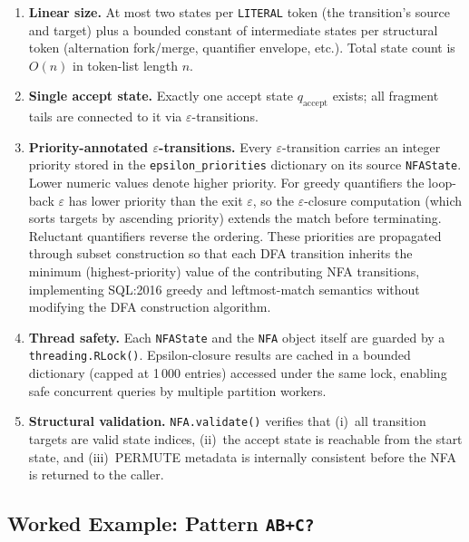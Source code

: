 \begin{enumerate}
  \item \textbf{Linear size.}  At most two states per
    \texttt{LITERAL} token (the transition's source and target)
    plus a bounded constant of intermediate states per structural
    token (alternation fork/merge, quantifier envelope, etc.).
    Total state count is $O(n)$ in token-list length $n$.

  \item \textbf{Single accept state.}  Exactly one accept state
    $q_\text{accept}$ exists; all fragment tails are connected to
    it via $\varepsilon$-transitions.

  \item \textbf{Priority-annotated $\varepsilon$-transitions.}
    Every $\varepsilon$-transition carries an integer priority
    stored in the \texttt{epsilon\_priorities} dictionary on its
    source \texttt{NFAState}.  Lower numeric values denote higher
    priority.  For greedy quantifiers the loop-back
    $\varepsilon$ has lower priority than the exit $\varepsilon$,
    so the $\varepsilon$-closure computation (which sorts targets by
    ascending priority) extends the match before terminating.
    Reluctant quantifiers reverse the ordering.  These priorities
    are propagated through subset construction so that each DFA
    transition inherits the minimum (highest-priority) value of the
    contributing NFA transitions, implementing SQL:2016 greedy and
    leftmost-match semantics without modifying the DFA construction
    algorithm.

  \item \textbf{Thread safety.}  Each \texttt{NFAState} and the
    \texttt{NFA} object itself are guarded by a
    \texttt{threading.RLock()}.  Epsilon-closure results are cached
    in a bounded dictionary (capped at 1\,000 entries) accessed
    under the same lock, enabling safe concurrent queries by
    multiple partition workers.

  \item \textbf{Structural validation.}  \texttt{NFA.validate()}
    verifies that (i)~all transition targets are valid state
    indices, (ii)~the accept state is reachable from the start
    state, and (iii)~PERMUTE metadata is internally consistent
    before the NFA is returned to the caller.
\end{enumerate}

\subsection{Worked Example: Pattern \texttt{A\;B+\;C?}}
\label{subsec:meth-nfa-example}

